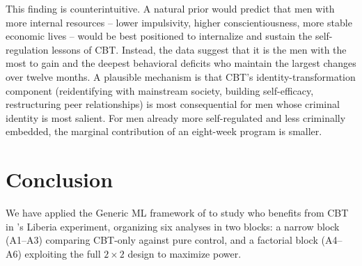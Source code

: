 \documentclass[11pt]{article}
\begin{document}
This finding is counterintuitive. A natural prior would predict that men with more internal resources -- lower impulsivity, higher conscientiousness, more stable economic lives -- would be best positioned to internalize and sustain the self-regulation lessons of CBT. Instead, the data suggest that it is the men with the most to gain and the deepest behavioral deficits who maintain the largest changes over twelve months. A plausible mechanism is that CBT's identity-transformation component (reidentifying with mainstream society, building self-efficacy, restructuring peer relationships) is most consequential for men whose criminal identity is most salient. For men already more self-regulated and less criminally embedded, the marginal contribution of an eight-week program is smaller.


\section{Conclusion}
\label{sec:conclusion}

We have applied the Generic ML framework of \citet{chernozhukov2025} to study who benefits from CBT in \citet{blattman2017}'s  Liberia experiment, organizing six analyses in two blocks: a narrow block (A1--A3) comparing CBT-only against pure control, and a factorial block (A4--A6) exploiting the full $2\times 2$ design to maximize power.
\end{document}
